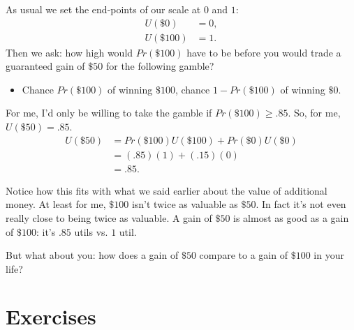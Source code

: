 \documentclass[justified]{tufte-book}
\providecommand{\tightlist}{%
  \setlength{\itemsep}{0pt}\setlength{\parskip}{0pt}}
\renewcommand{\u}{U}
\newcommand{\p}{Pr}
\theoremstyle{definition}
\theoremstyle{definition}
\theoremstyle{definition}
\theoremstyle{remark}
\begin{document}
As usual we set the end-points of our scale at \(0\) and \(1\):
\[
  \begin{aligned}
    \u(\$0)   &= 0,\\
    \u(\$100) &= 1.
  \end{aligned}
\]
Then we ask: how high would \(\p(\$100)\) have to be before you would trade a guaranteed gain of \(\$50\) for the following gamble?

\begin{itemize}
\tightlist
\item
  Chance \(\p(\$100)\) of winning \(\$100\), chance \(1-\p(\$100)\) of winning \(\$0\).
\end{itemize}

For me, I'd only be willing to take the gamble if \(\p(\$100) \geq .85\). So, for me, \(\u(\$50) = .85\).
\[
  \begin{aligned}
    \u(\$50) &= \p(\$100)\u(\$100) + \p(\$0)\u(\$0)\\
             &= (.85)(1) + (.15)(0)\\
             &= .85.
  \end{aligned}
\]

Notice how this fits with what we said earlier about the value of additional money. At least for me, \(\$100\) isn't twice as valuable as \(\$50\). In fact it's not even really close to being twice as valuable. A gain of \(\$50\) is almost as good as a gain of \(\$100\): it's \(.85\) utils vs. \(1\) util.

But what about you: how does a gain of \(\$50\) compare to a gain of \(\$100\) in your life?

\hypertarget{exercises-9}{%
\section*{Exercises}\label{exercises-9}}
\end{document}
